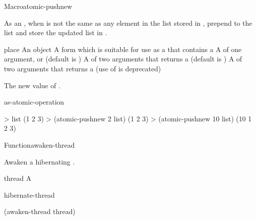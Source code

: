 \documentclass[10pt,twoside,english,pdftex]{article}
\begin{document}
\begin{functiondoc}{Macro}{atomic-pushnew}{ 
     
    \returns{} }
%

\fnsyntax

\fnpurpose As an , when  is not
the same as any element in the list stored in , prepend
 to the list and store the updated list in .

\fnpackage {}

\fnmodule {}

\fnargs
\begin{args}{place}
\arg[item] An object
\arg[place] A form which is suitable for use as a
 that contains a  
\arg[key] A  of one argument, or \nil{} (default is \nil)
\arg[test] A  of two arguments that returns a
 (default is ) 
 A  of two arguments that returns a
 (use of  is deprecated)
\end{args}

\fnreturns The new value of . 

\begin{alsos}{as-atomic-operation}
\end{alsos}

\fnexamples
\begin{example}
> list
(1 2 3)
> (atomic-pushnew 2 list)
(1 2 3)
> (atomic-pushnew 10 list)
(10 1 2 3)
\end{example}

\end{functiondoc}


\begin{functiondoc}{Function}{awaken-thread}{}
%
%

\fnsyntax

\fnpurpose Awaken a hibernating .

\fnpackage {}

\fnmodule {}

\fnargs
\begin{args}{thread}
\arg[thread] A 
\end{args}

\fnerrors
\nothreads{}

\begin{alsos}{hibernate-thread}
\end{alsos}

\fnexample
\begin{example}
  (awaken-thread thread)
\end{example}

\end{functiondoc}
\end{document}
